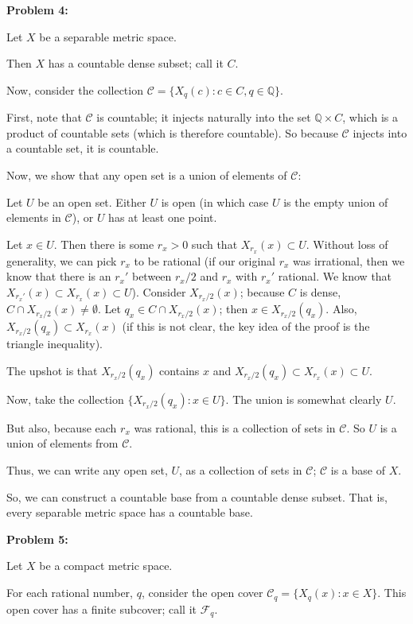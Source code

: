 \documentclass[a4paper,12pt]{article}
\newcommand{\tab}{\hspace{4mm}} %
\newcommand{\shunt}{\vspace{20mm}}
\newcommand{\Q}{\mathbb{Q}}
\newcommand{\scrC}{\mathcal{C}}
\newcommand{\scrF}{\mathcal{F}}
\begin{document}
\shunt

{\bf Problem 4:}

Let $X$ be a separable metric space.

Then $X$ has a countable dense subset; call it $C$.

Now, consider the collection $\scrC = \{X_q(c): c \in C, q \in \Q\}$.

First, note that $\scrC$ is countable; it injects naturally into the set $\Q \times C$, which is a product of countable sets (which is therefore countable). So because $\scrC$ injects into a countable set, it is countable.

Now, we show that any open set is a union of elements of $\scrC$:

\tab Let $U$ be an open set. Either $U$ is open (in which case $U$ is the empty union of elements in $\scrC$), or $U$ has at least one point.

\tab Let $x \in U$. Then there is some $r_x>0$ such that $X_{r_x}(x) \subset U$. Without loss of generality, we can pick $r_x$ to be rational (if our original $r_x$ was irrational, then we know that there is an $r_x'$ between $r_x/2$ and $r_x$ with $r_x'$ rational. We know that $X_{r_x'}(x) \subset X_{r_x}(x) \subset U$). Consider $X_{r_x/2}(x)$; because $C$ is dense, $C \cap X_{r_x/2}(x) \neq \emptyset$. Let $q_x \in C \cap X_{r_x/2}(x)$; then $x \in X_{r_x/2}(q_x)$. Also, $X_{r_x/2}(q_x) \subset X_{r_x}(x)$ (if this is not clear, the key idea of the proof is the triangle inequality).

\tab The upshot is that $X_{r_x/2}(q_x)$ contains $x$ and $X_{r_x/2}(q_x) \subset X_{r_x}(x) \subset U$.

\tab Now, take the collection $\{X_{r_x/2}(q_x): x \in U\}$. The union is somewhat clearly $U$. 

\tab But also, because each $r_x$ was rational, this is a collection of sets in $\scrC$. So $U$ is a union of elements from $\scrC$.

\tab Thus, we can write any open set, $U$, as a collection of sets in $\scrC$; $\scrC$ is a base of $X$.

So, we can construct a countable base from a countable dense subset. That is, every separable metric space has a countable base.

\shunt

{\bf Problem 5:}

Let $X$ be a compact metric space.

For each rational number, $q$, consider the open cover $\scrC_q = \{X_q(x): x \in X\}$. This open cover has a finite subcover; call it $\scrF_q$.
\end{document}
